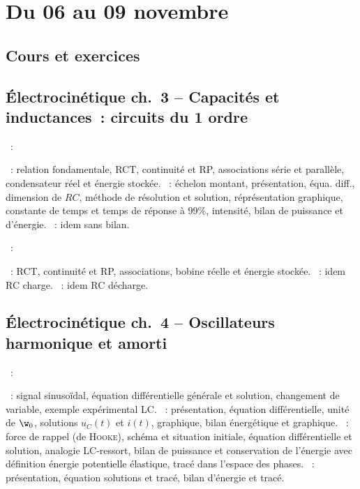 \documentclass[a4paper, 12pt, final, garamond]{book}
\begin{document}
\setcounter{chapter}{5}

\chapter{Du 06 au 09 novembre}

\section{Cours et exercices}

\section*{Électrocinétique ch.\ 3 -- Capacités et inductances~: circuits du
  1\ier{} ordre}
\begin{enumerate}[label=\Roman*]
	~:
	\begin{enumerate}[label=\Alph*]
		~: relation fondamentale, RCT, continuité et
		RP, associations série et parallèle, condensateur réel et énergie stockée.
		~: échelon montant, présentation, équa.
		diff., dimension de $RC$, méthode de résolution et solution, réprésentation
		graphique, constante de temps et temps de réponse à 99\%, intensité, bilan de
		puissance et d'énergie.
		~: idem sans bilan.
	\end{enumerate}
	~:
	\begin{enumerate}[label=\Alph*]
		~: RCT, continuité et RP, associations, bobine
		réelle et énergie stockée.
		~: idem RC charge.
		~: idem RC décharge.
	\end{enumerate}
\end{enumerate}

\section*{Électrocinétique ch.\ 4 -- Oscillateurs harmonique et amorti}
\begin{enumerate}[label=\Roman*]
	~:
	\begin{enumerate}[label=\Alph*]
		~: signal sinusoïdal, équation différentielle
		générale et solution, changement de variable, exemple expérimental LC.
		~: présentation, équation
		différentielle, unité de $\w_0$, solutions $u_C(t)$ et $i(t)$, graphique,
		bilan énergétique et graphique.
    ~: force de rappel (de \textsc{Hooke}),
    schéma et situation initiale, équation différentielle et solution, analogie
    LC-ressort, bilan de puissance et conservation de l'énergie avec définition
    énergie potentielle élastique, tracé dans l'espace des phases.
    ~: présentation, équation solutions
    et tracé, bilan d'énergie et tracé.
	\end{enumerate}
\end{enumerate}
\end{document}
